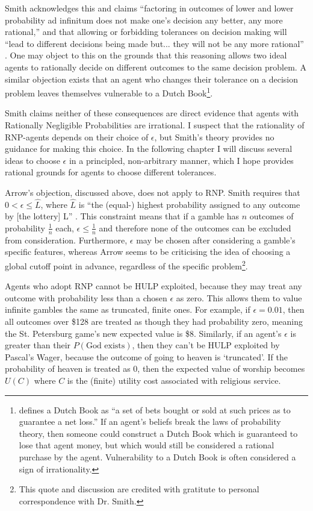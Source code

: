 \documentclass{article}
\begin{document}
Smith acknowledges this and claims ``factoring in outcomes of lower and lower probability ad infinitum does not make one’s decision any better, any more rational,'' and that allowing or forbidding tolerances on decision making will ``lead to different decisions being made \textemdash{} but... they will not be any more rational'' \citep[pg. 475]{smith2014evaluative}. One may object to this on the grounds that this reasoning allows two ideal agents to rationally decide on different outcomes to the same decision problem. A similar objection exists that an agent who changes their tolerance on a decision problem leaves themselves vulnerable to a Dutch Book\footnote{\citep{hajek2008dutch} defines a Dutch Book as ``a set of bets bought or sold at such prices as to guarantee a net loss.'' If an agent's beliefs break the laws of probability theory, then someone could construct a Dutch Book which is guaranteed to lose that agent money, but which would still be considered a rational purchase by the agent. Vulnerability to a Dutch Book is often considered a sign of irrationality.}. 

Smith claims neither of these consequences are direct evidence that agents with Rationally Negligible Probabilities are irrational. I suspect that the rationality of RNP-agents depends on their choice of \(\epsilon\), but Smith's theory provides no guidance for making this choice. In the following chapter I will discuss several ideas to choose \(\epsilon\) in a principled, non-arbitrary manner, which I hope provides rational grounds for agents to choose different tolerances. 

Arrow's objection, discussed above, does not apply to RNP. Smith requires that \(0 < \epsilon \leq \hat{L}\), where \(\hat{L}\) is ``the (equal-) highest probability assigned to any outcome by [the lottery] L'' \citep[pg. 479]{smith2014evaluative}. This constraint means that if a gamble has \(n\) outcomes of probability \(\frac{1}{n}\) each, \(\epsilon \leq \frac{1}{n}\) and therefore none of the outcomes can be excluded from consideration. Furthermore, \(\epsilon\) may be chosen after considering a gamble's specific features, whereas Arrow seems to be criticising the idea of choosing a global cutoff point in advance, regardless of the specific problem\footnote{This quote and discussion are credited with gratitute to personal correspondence with Dr. Smith.}.

Agents who adopt RNP cannot be HULP exploited, because they may treat any outcome with probability less than a chosen \(\epsilon\) as zero. This allows them to value infinite gambles the same as truncated, finite ones. For example, if \(\epsilon = 0.01\), then all outcomes over \$128 are treated as though they had probability zero, meaning the St. Petersburg game's new expected value is \$8. Similarly, if an agent's \(\epsilon\) is greater than their \(P(\text{God exists})\), then they can't be HULP exploited by Pascal's Wager, because the outcome of going to heaven is `truncated'. If the probability of heaven is treated as 0, then the expected value of worship becomes \(U(C)\) where \(C\) is the (finite) utility cost associated with religious service.
\end{document}
